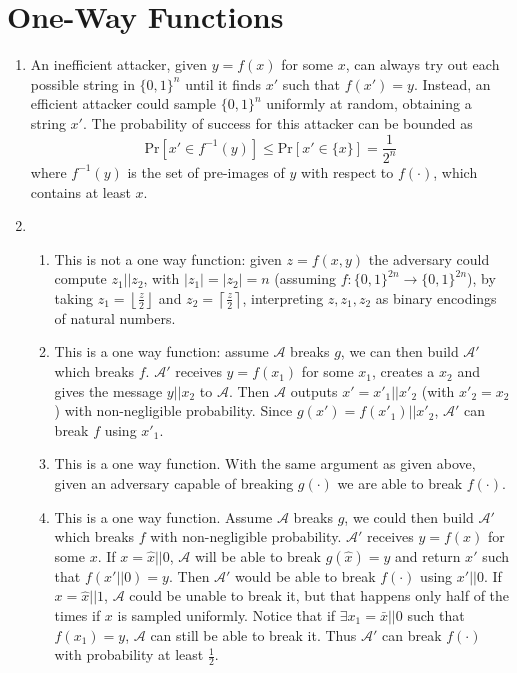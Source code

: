 \documentclass{article}
\newcommand{\adversary}{\mathcal{A}}
\renewcommand{\Pr}[1]{\ensuremath{\mathrm{Pr} \left[ {#1} \right]}}
\newcommand{\abs}[1]{\left| {#1} \right|}
\newcommand{\floor}[1]{\left\lfloor {#1} \right\rfloor}
\newcommand{\ceil}[1]{\left\lceil {#1} \right\rceil}
\begin{document}
\section{One-Way Functions}

\begin{enumerate}
	\item An inefficient attacker, given $y = f(x)$ for some $x$, can always try out each possible string in $\{0,1\}^{n}$ until it finds $x'$ such that $f(x')=y$.
		Instead, an efficient attacker could sample $\{0,1\}^{n}$ uniformly at random, obtaining a string $x'$.
		The probability of success for this attacker can be bounded as
		\[
			\Pr{x' \in f^{-1}(y)} \le \Pr{x' \in \{x\}} = \frac{1}{2^n}
		\]
		where $f^{-1}(y)$ is the set of pre-images of $y$ with respect to $f(\cdot)$, which contains at least $x$.

	\item
		\begin{enumerate}
			\item This is not a one way function: given $z = f(x,y)$ the adversary could compute $z_1 || z_2$, with $\abs{z_1} = \abs{z_2} = n$ (assuming $f : \{0,1\}^{2n} \to \{0,1\}^{2n}$), by taking $z_1 = \floor{\frac{z}{2}}$ and $z_2 = \ceil{\frac{z}{2}}$, interpreting $z, z_1, z_2$ as binary encodings of natural numbers.
			\item This is a one way function: assume $\adversary$ breaks $g$, we can then build $\adversary'$ which breaks $f$.
				$\adversary'$ receives $y = f(x_1)$ for some $x_1$, creates a $x_2$ and gives the message $y || x_2$ to $\adversary$.
				Then $\adversary$ outputs $x' = x'_1 || x'_2$ (with $x'_2 = x_2$) with non-negligible probability.
				Since $g(x') = f(x'_1) || x'_2$, $\adversary'$ can break $f$ using $x'_1$.
			\item This is a one way function.
				With the same argument as given above, given an adversary capable of breaking $g(\cdot)$ we are able to break $f(\cdot)$.
			\item This is a one way function.
				Assume $\adversary$ breaks $g$, we could then build $\adversary'$ which breaks $f$ with non-negligible probability.
				$\adversary'$ receives $y = f(x)$ for some $x$.
				If $x = \hat{x} || 0$, $\adversary$ will be able to break $g(\hat{x}) = y$ and return $x'$ such that $f(x' || 0) = y$.
				Then $\adversary'$ would be able to break $f(\cdot)$ using $x' || 0$.
				If $x = \hat{x} || 1$, $\adversary$ could be unable to break it, but that happens only half of the times if $x$ is sampled uniformly.
				Notice that if $\exists x_1 = \bar{x} || 0$ such that $f(x_1) = y$, $\adversary$ can still be able to break it.
				Thus $\adversary'$ can break $f(\cdot)$ with probability at least $\frac{1}{2}$.
		\end{enumerate}
\end{enumerate}
\end{document}

